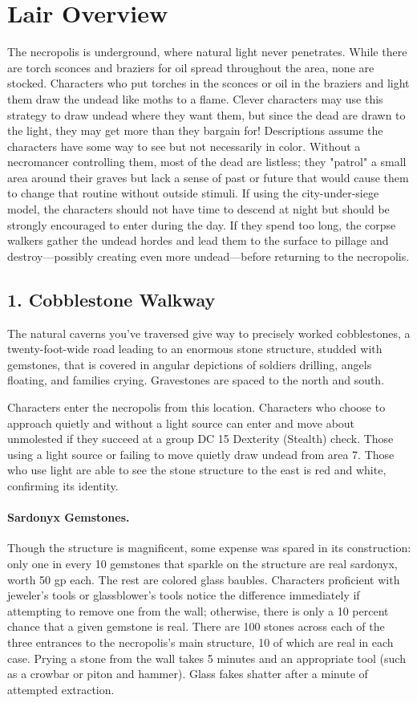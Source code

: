 \documentclass[10pt,a4paper,twoside,twocolumn,openany,bg=print,nodeprecatedcode]{dndbook}
\begin{document}
\section{Lair Overview}
The necropolis is underground, where natural light never penetrates. While there are torch sconces and braziers for oil spread throughout the area, none are stocked. Characters who put torches in the sconces or oil in the braziers and light them draw the undead like moths to a flame. Clever characters may use this strategy to draw undead where they want them, but since the dead are drawn to the light, they may get more than they bargain for! Descriptions assume the characters have some way to see but not necessarily in color.
Without a necromancer controlling them, most of the dead are listless; they "patrol" a small area around their graves but lack a sense of past or future that would cause them to change that routine without outside stimuli. If using the city-under-siege model, the characters should not have time to descend at night but should be strongly encouraged to enter during the day. If they spend too long, the corpse walkers gather the undead hordes and lead them to the surface to pillage and destroy—possibly creating even more undead—before returning to the necropolis.
\subsection{1. Cobblestone Walkway}
\begin{DndReadAloud}{}
The natural caverns you've traversed give way to precisely worked cobblestones, a twenty-foot-wide road leading to an enormous stone structure, studded with gemstones, that is covered in angular depictions of soldiers drilling, angels floating, and families crying. Gravestones are spaced to the north and south.
\end{DndReadAloud}

Characters enter the necropolis from this location. Characters who choose to approach quietly and without a light source can enter and move about unmolested if they succeed at a group DC 15 Dexterity (Stealth) check. Those using a light source or failing to move quietly draw undead from area 7. Those who use light are able to see the stone structure to the east is red and white, confirming its identity.
\paragraph{Sardonyx Gemstones.}
Though the structure is magnificent, some expense was spared in its construction: only one in every 10 gemstones that sparkle on the structure are real sardonyx, worth 50 gp each. The rest are colored glass baubles. Characters proficient with jeweler's tools or glassblower's tools notice the difference immediately if attempting to remove one from the wall; otherwise, there is only a 10 percent chance that a given gemstone is real. There are 100 stones across each of the three entrances to the necropolis's main structure, 10 of which are real in each case. Prying a stone from the wall takes 5 minutes and an appropriate tool (such as a crowbar or piton and hammer). Glass fakes shatter after a minute of attempted extraction.
\end{document}
